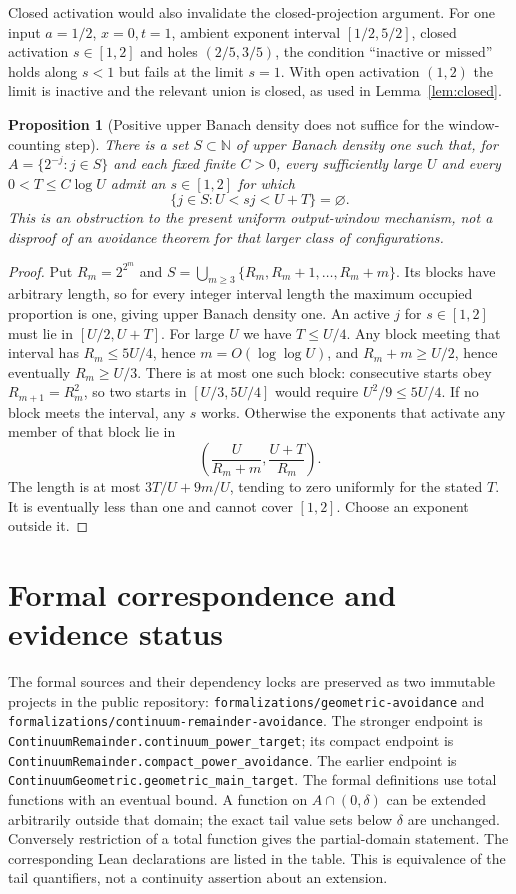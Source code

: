 \documentclass[11pt]{article}
\newtheorem{proposition}[theorem]{Proposition}
\theoremstyle{definition}
\theoremstyle{remark}
\newcommand{\N}{\mathbb N}
\newcommand{\code}[1]{{\small\nolinkurl{#1}}}
\begin{document}
Closed activation would also invalidate the closed-projection argument.
For one input $a=1/2$, $x=0,t=1$, ambient exponent interval $[1/2,5/2]$,
closed activation $s\in[1,2]$ and holes
$(2/5,3/5)$, the condition ``inactive or missed'' holds along $s<1$ but fails
at the limit $s=1$. With open activation $(1,2)$ the limit is inactive and
the relevant union is closed, as used in Lemma~\ref{lem:closed}.

\begin{proposition}[Positive upper Banach density does not suffice for the
window-counting step]\label{prop:obstruction}
There is a set $S\subset\N$ of upper Banach density one such that, for
$A=\{2^{-j}:j\in S\}$ and each fixed finite $C>0$, every sufficiently large
$U$ and every $0<T\leq C\log U$ admit an $s\in[1,2]$ for which
\[
 \{j\in S:U<sj<U+T\}=\varnothing.
\]
This is an obstruction to the present uniform output-window mechanism, not
a disproof of an avoidance theorem for that larger class of configurations.
\end{proposition}
\begin{proof}
Put $R_m=2^{2^m}$ and
$S=\bigcup_{m\geq3}\{R_m,R_m+1,\ldots,R_m+m\}$. Its blocks have arbitrary
length, so for every integer interval length the maximum occupied proportion
is one, giving upper Banach density one. An active $j$ for $s\in[1,2]$ must
lie in $[U/2,U+T]$. For large $U$ we have $T\leq U/4$. Any block meeting that
interval has $R_m\leq5U/4$, hence $m=O(\log\log U)$, and
$R_m+m\geq U/2$, hence eventually $R_m\geq U/3$.
There is at most one such block: consecutive starts obey $R_{m+1}=R_m^2$,
so two starts in $[U/3,5U/4]$ would require $U^2/9\leq5U/4$.
If no block meets the interval, any $s$ works. Otherwise the exponents that
activate any member of that block lie in
\[
 \left(\frac{U}{R_m+m},\frac{U+T}{R_m}\right).
\]
The length is at most $3T/U+9m/U$, tending to zero uniformly for the stated
$T$. It is eventually less than one and cannot cover $[1,2]$. Choose an
exponent outside it.
\end{proof}

\appendix
\section{Formal correspondence and evidence status}\label{app:formal}
The formal sources and their dependency locks are preserved as two immutable
projects in the public repository: \nolinkurl{formalizations/geometric-avoidance} and \nolinkurl{formalizations/continuum-remainder-avoidance}. The stronger endpoint is
\code{ContinuumRemainder.continuum_power_target}; its compact endpoint is
\code{ContinuumRemainder.compact_power_avoidance}. The earlier endpoint is
\code{ContinuumGeometric.geometric_main_target}. The formal definitions use
total functions with an eventual bound. A function on
$A\cap(0,\delta)$ can be extended arbitrarily outside that domain; the exact
tail value sets below $\delta$ are unchanged. Conversely restriction of a
total function gives the partial-domain statement. The corresponding Lean
declarations are listed in the table. This is equivalence of the tail
quantifiers, not a continuity assertion about an extension.
\end{document}
